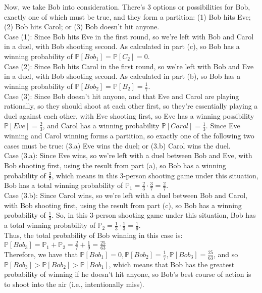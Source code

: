 \documentclass{article}
\begin{document}
Now, we take Bob into consideration. There's 3 options or possibilities for Bob, exactly one of which must be true, and they form a partition: (1) Bob hits Eve; (2) Bob hits Carol; or (3) Bob doesn't hit anyone. \\

Case (1): Since Bob hits Eve in the first round, so we're left with Bob and Carol in a duel, with Bob shooting second. As calculated in part (c), so Bob has a winning probability of $\mathbb{P}[Bob_1] = \mathbb{P}[C_2] = 0$. \\

Case (2): Since Bob hits Carol in the first round, so we're left with Bob and Eve in a duel, with Bob shooting second. As calculated in part (b), so Bob has a winning probability of $\mathbb{P}[Bob_2] = \mathbb{P}[B_2] = \frac{1}{7}$. \\

Case (3): Since Bob doesn't hit anyone, and that Eve and Carol are playing rationally, so they should shoot at each other first, so they're essentially playing a duel against each other, with Eve shooting first, so Eve has a winning possibility $\mathbb{P}[Eve] = \frac{2}{3}$, and Carol has a winning probability $\mathbb{P}[Carol] = \frac{1}{3}$. Since Eve winning and Carol winning forms a partition, so exactly one of the following two cases must be true: (3.a) Eve wins the duel; or (3.b) Carol wins the duel. \\[.1cm]
\indent\indent Case (3.a): Since Eve wins, so we're left with a duel between Bob and Eve, with Bob shooting first, using the result from part (a), so Bob has a winning probability of $\frac{3}{7}$, which means in this 3-person shooting game under this situation, Bob has a total winning probability of $\mathbb{P}_1 = \frac{2}{3}\cdot\frac{3}{7} = \frac{2}{7}$. \\[.1cm]
\indent\indent Case (3.b): Since Carol wins, so we're left with a duel between Bob and Carol, with Bob shooting first, using the result from part (c), so Bob has a winning probability of $\frac{1}{3}$. So, in this 3-person shooting game under this situation, Bob has a total winning probability of $\mathbb{P}_2 = \frac{1}{3}\cdot\frac{1}{3} = \frac{1}{9}$. \\

Thus, the total probability of Bob winning in this case is: $\mathbb{P}[Bob_3] = \mathbb{P}_1 + \mathbb{P}_2 = \frac{2}{7} + \frac{1}{9} = \frac{25}{63}$ \\

Therefore, we have that $\mathbb{P}[Bob_1] = 0, \mathbb{P}[Bob_2] = \frac{1}{7}, \mathbb{P}[Bob_3] = \frac{25}{63}$, and so $\mathbb{P}[Bob_3] > \mathbb{P}[Bob_2] > \mathbb{P}[Bob_1]$, which means that Bob has the greatest probability of winning if he doesn't hit anyone, so Bob’s best course of action is to shoot into the air (i.e., intentionally miss).
\end{document}
